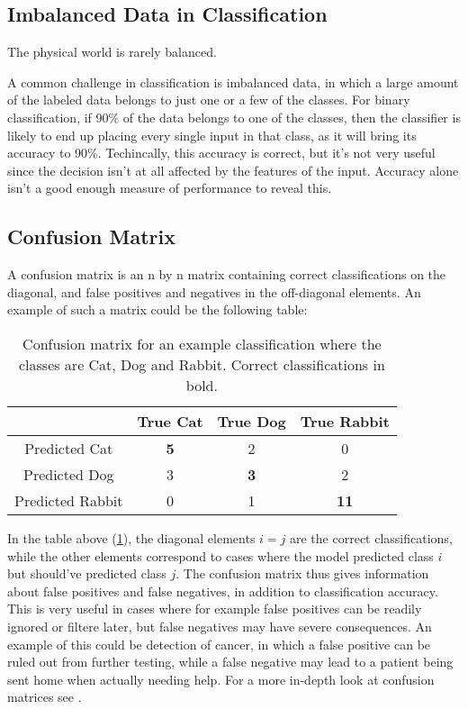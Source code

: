 \subsection{Imbalanced Data in Classification}
The physical world is rarely balanced.

A common challenge in classification is imbalanced data, in which a large
amount of the labeled data belongs to just one or a few of the classes.
For binary classification, if 90\% of the data belongs to one of the classes,
then the classifier is likely to end up placing every single
input in that class, as it will bring its accuracy to 90\%. Techincally, this
accuracy is correct, but it's not very useful since the decision isn't at all
affected by the features of the input. Accuracy alone isn't a good enough
measure of performance to reveal this.

\subsection{Confusion Matrix}
A confusion matrix is an n by n matrix containing correct classifications
on the diagonal, and false positives and negatives in the off-diagonal elements.
An example of such a matrix could be the following table:
\begin{table}[h]
    \centering
    \begin{tabular}{c|c|c|c}
     & True Cat & True Dog & True Rabbit \\
    \hline
    Predicted Cat & \textbf{5} & 2 & 0 \\
    \hline
    Predicted Dog & 3 & \textbf{3} & 2 \\
    \hline
    Predicted Rabbit & 0 & 1 & \textbf{11} \\
\end{tabular}
\caption{Confusion matrix for an example classification where the classes
         are Cat, Dog and Rabbit. Correct classifications in bold.}
\label{tab:confmat-example}
\end{table}
In the table above (\ref{tab:confmat-example}), the diagonal elements
$i = j$ are the correct classifications, while the other elements correspond
to cases where the model predicted class $i$ but should've predicted class $j$.
The confusion matrix thus gives information about false positives and false
negatives, in addition to classification accuracy. This is very useful
in cases where for example false positives can be readily ignored or filtere
later, but false negatives may have severe consequences. An example of this
could be detection of cancer, in which a false positive can be ruled out
from further testing, while a false negative may lead to a patient being sent
home when actually needing help. For a more in-depth look at confusion matrices
see \cite{Fawcett2006}.

